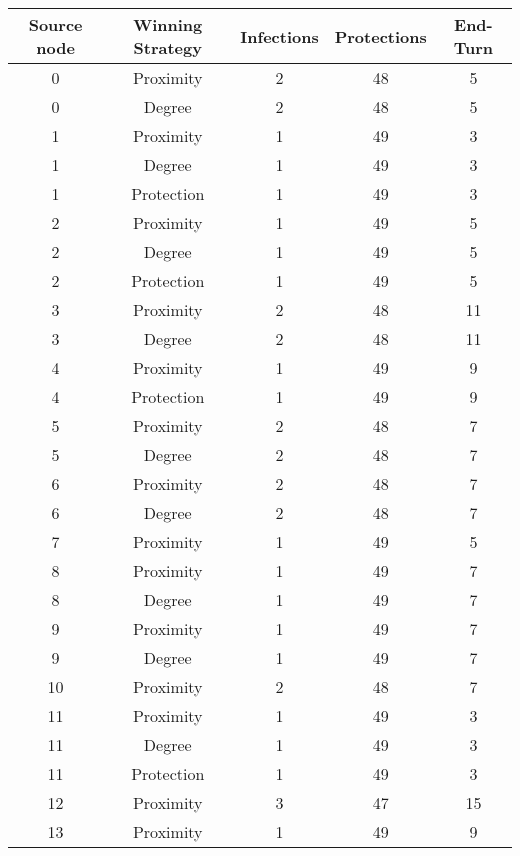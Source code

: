 \documentclass[results.tex]{subfiles}
\begin{document}
\begin{center}
  \begin{tabular}{| c || c | c | c | c |}
    \hline
    {\bfseries Source node} & {\bfseries Winning Strategy} & {\bfseries Infections} & {\bfseries Protections} & {\bfseries End-Turn} \\  %
    \hline\hline
    0 & Proximity & 2 & 48 & 5 \\ 
    \hline
    0 & Degree & 2 & 48 & 5 \\ 
    \hline
    1 & Proximity & 1 & 49 & 3 \\ 
    \hline
    1 & Degree & 1 & 49 & 3 \\ 
    \hline
    1 & Protection & 1 & 49 & 3 \\ 
    \hline
    2 & Proximity & 1 & 49 & 5 \\ 
    \hline
    2 & Degree & 1 & 49 & 5 \\ 
    \hline
    2 & Protection & 1 & 49 & 5 \\ 
    \hline
    3 & Proximity & 2 & 48 & 11 \\ 
    \hline
    3 & Degree & 2 & 48 & 11 \\ 
    \hline
    4 & Proximity & 1 & 49 & 9 \\ 
    \hline
    4 & Protection & 1 & 49 & 9 \\ 
    \hline
    5 & Proximity & 2 & 48 & 7 \\ 
    \hline
    5 & Degree & 2 & 48 & 7 \\ 
    \hline
    6 & Proximity & 2 & 48 & 7 \\ 
    \hline
    6 & Degree & 2 & 48 & 7 \\ 
    \hline
    7 & Proximity & 1 & 49 & 5 \\ 
    \hline
    8 & Proximity & 1 & 49 & 7 \\ 
    \hline
    8 & Degree & 1 & 49 & 7 \\ 
    \hline
    9 & Proximity & 1 & 49 & 7 \\ 
    \hline
    9 & Degree & 1 & 49 & 7 \\ 
    \hline
    10 & Proximity & 2 & 48 & 7 \\ 
    \hline
    11 & Proximity & 1 & 49 & 3 \\ 
    \hline
    11 & Degree & 1 & 49 & 3 \\ 
    \hline
    11 & Protection & 1 & 49 & 3 \\ 
    \hline
    12 & Proximity & 3 & 47 & 15 \\ 
    \hline
    13 & Proximity & 1 & 49 & 9 \\ 

\end{tabular}
\end{center}
\end{document}
